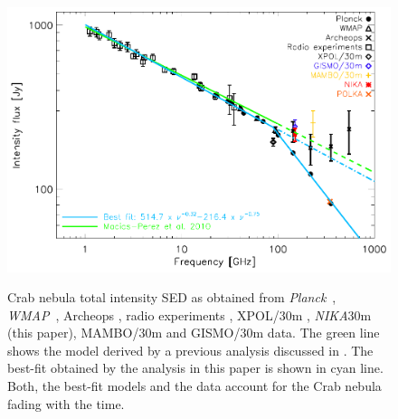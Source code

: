 \documentclass[twocolumn,traditabstract]{aa}
\def\NIKA{\textit{NIKA}}
\def\Planck{\textit{Planck}}
\def\WMAP{\textit{WMAP}}
\begin{document}

\begin{figure}
  \centering
          { \includegraphics[width=1\linewidth,keepaspectratio]{figures/Crab_SED_int_test.pdf}}
           \caption{Crab nebula total intensity SED as obtained from \Planck\ \citep{2015arXiv150702058P}, \WMAP\ \citep{2011ApJS..192...19W}, Archeops \citep{macias2007archeops}, radio experiments \citep{dmitrenko1970absolute, 1971IzVUZ..14..157V}, XPOL/30m \citep{aumont2010}, \NIKA\/30m (this paper), MAMBO/30m \citep{2002A&A...386.1044B} and GISMO/30m \citep{2011ApJ...734...54A} data. The green line shows the model derived by a previous analysis discussed in \citep{macias2010}. The best-fit obtained by the analysis in this paper is shown in cyan line. Both, the best-fit models and the data account for the Crab nebula fading with the time.}
\label{crab_SED}		
  \end{figure} 
\end{document}
